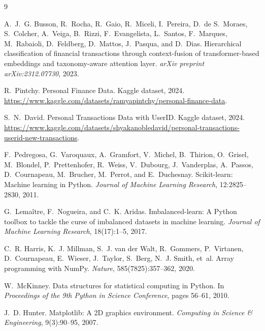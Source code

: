 \documentclass[11pt]{article}
\begin{document}
\clearpage
\begin{thebibliography}{9}

A.~J.~G. Busson, R.~Rocha, R.~Gaio, R.~Miceli, I.~Pereira, D.~de S.~Moraes,
S.~Colcher, A.~Veiga, B.~Rizzi, F.~Evangelista, L.~Santos, F.~Marques,
M.~Rabaioli, D.~Feldberg, D.~Mattos, J.~Pasqua, and D.~Dias.
\newblock Hierarchical classification of financial transactions through
  context-fusion of transformer-based embeddings and taxonomy-aware
  attention layer.
\newblock \emph{arXiv preprint arXiv:2312.07730}, 2023.

R.~Pintchy.
\newblock Personal Finance Data.
\newblock Kaggle dataset, 2024.
\newblock \url{https://www.kaggle.com/datasets/ramyapintchy/personal-finance-data}.

S.~N.~David.
\newblock Personal Transactions Data with UserID.
\newblock Kaggle dataset, 2024.
\newblock \url{https://www.kaggle.com/datasets/shyakanobledavid/personal-transactions-userid-new-transactions}.

F.~Pedregosa, G.~Varoquaux, A.~Gramfort, V.~Michel, B.~Thirion, O.~Grisel,
M.~Blondel, P.~Prettenhofer, R.~Weiss, V.~Dubourg, J.~Vanderplas, A.~Passos,
D.~Cournapeau, M.~Brucher, M.~Perrot, and E.~Duchesnay.
\newblock Scikit-learn: Machine learning in {P}ython.
\newblock \emph{Journal of Machine Learning Research}, 12:2825--2830, 2011.

G.~Lemaître, F.~Nogueira, and C.~K. Aridas.
\newblock Imbalanced-learn: A {P}ython toolbox to tackle the curse of
  imbalanced datasets in machine learning.
\newblock \emph{Journal of Machine Learning Research}, 18(17):1--5, 2017.

C.~R. Harris, K.~J. Millman, S.~J. van der Walt, R.~Gommers, P.~Virtanen,
D.~Cournapeau, E.~Wieser, J.~Taylor, S.~Berg, N.~J. Smith, et~al.
\newblock Array programming with {N}um{P}y.
\newblock \emph{Nature}, 585(7825):357--362, 2020.

W.~McKinney.
\newblock Data structures for statistical computing in {P}ython.
\newblock In \emph{Proceedings of the 9th Python in Science Conference},
  pages 56--61, 2010.

J.~D. Hunter.
\newblock Matplotlib: A 2{D} graphics environment.
\newblock \emph{Computing in Science \& Engineering}, 9(3):90--95, 2007.

\end{thebibliography}
\end{document}
